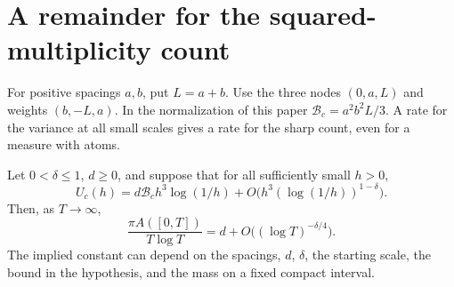 \section{A remainder for the squared-multiplicity count}
\label{sec:rate}

For positive spacings $a,b$, put $L=a+b$. Use the three nodes
$(0,a,L)$ and weights $(b,-L,a)$. In the normalization of this paper
$\mathcal B_c=a^2 b^2 L/3$. A rate for the variance at all small scales
gives a rate for the sharp count, even for a measure with atoms.

\begin{theorem}
\label{thm:rate}
Let $0<\delta\le1$, $d\ge0$, and suppose that for all sufficiently small $h>0$,
\[
 U_c(h)=d\mathcal B_c h^3\log(1/h)
               +O\bigl(h^3(\log(1/h))^{1-\delta}\bigr).
\]
Then, as $T\to\infty$,
\[
 \frac{\pi A([0,T])}{T\log T}
      =d+O\bigl((\log T)^{-\delta/4}\bigr).
\]
The implied constant can depend on the spacings, $d$, $\delta$, the starting
scale, the bound in the hypothesis, and the mass on a fixed compact interval.
\end{theorem}

